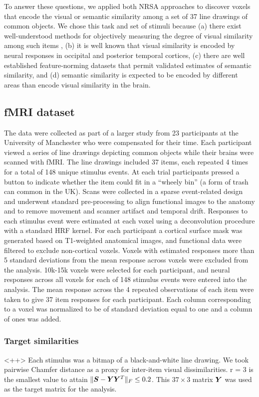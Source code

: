 To answer these questions, we applied both NRSA approaches to discover voxels that
encode the visual or semantic similarity among a set of 37 line drawings of common objects.
We chose this task and set of stimuli because (a) there exist well-understood methods for
objectively measuring the degree of visual similarity among such items \cite{antani02},
(b) it is well known that visual similarity is encoded by neural responses in occipital
and posterior temporal cortices, (c) there are well established feature-norming datasets
that permit validated estimates of semantic similarity, and (d) semantic similarity is
expected to be encoded by different areas than encode visual similarity in the brain.

\subsection{fMRI dataset} The data were collected as part of a larger study from 23
participants at the University of Manchester who were compensated for their time. Each
participant viewed a series of line drawings depicting common objects while their brains
were scanned with fMRI. The line drawings included 37 items, each repeated 4 times for a
total of 148 unique stimulus events. At each trial participants pressed a button to
indicate whether the item could fit in a ``wheely bin'' (a form of trash can common in the
UK).  Scans were collected in a sparse event-related design and underwent standard
pre-processing to align functional images to the anatomy and to remove movement and scanner
artifact and temporal drift. Responses to each stimulus event were estimated at each voxel
using a deconvolution procedure with a standard HRF kernel. For each participant a cortical
surface mask was generated based on T1-weighted anatomical images, and functional data were
filtered to exclude non-cortical voxels. Voxels with estimated responses more than 5
standard deviations from the mean response across voxels were excluded from the analysis.
10k-15k voxels were selected for each participant, and neural responses across all voxels
for each of 148 stimulus events were entered into the analysis. The mean response across
the 4 repeated observations of each item were taken to give 37 item responses for each
participant. Each column corresponding to a voxel was normalized to be of standard
deviation equal to one and a column of ones was added.

\subsubsection*{Target similarities}
<++>
 Each stimulus was a bitmap of a black-and-white line drawing. We took pairwise Chamfer distance as a proxy for inter-item visual dissimilarities. r = 3 is the smallest value to attain $\|\boldsymbol{S} - \boldsymbol{Y}\boldsymbol{Y}^T\|_F \leq 0.2$. This $37 \times 3$ matrix $\boldsymbol{Y}$ was used as the target matrix for the analysis.

